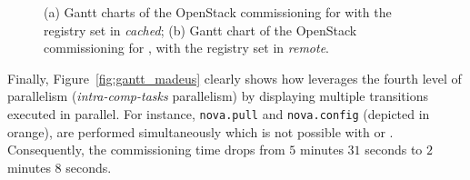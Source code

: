 \begin{figure}[t]
	\begin{center}
		\def\svgwidth{\columnwidth}
		\tiny
		\def\svgwidth{\columnwidth}
		\tiny
		\caption{(a) Gantt charts of the OpenStack
			commissioning for \madass with the
			registry set in \emph{cached}; (b) Gantt chart of the OpenStack
			commissioning for \madass, with the registry set in
			\emph{remote}.}
		\label{}
	\end{center}
\end{figure}

Finally, Figure~\ref{fig:gantt_madeus} clearly shows how \mad
leverages the fourth level of parallelism (\ie \emph{intra-comp-tasks}
parallelism) by displaying multiple transitions executed in
parallel. For instance, \texttt{nova.pull} and
\texttt{nova.config} (depicted in orange), are performed
simultaneously which is not possible with \ansible
or \aeolus. Consequently, the commissioning time drops from $5$
minutes $31$ seconds to $2$ minutes $8$ seconds.
%

